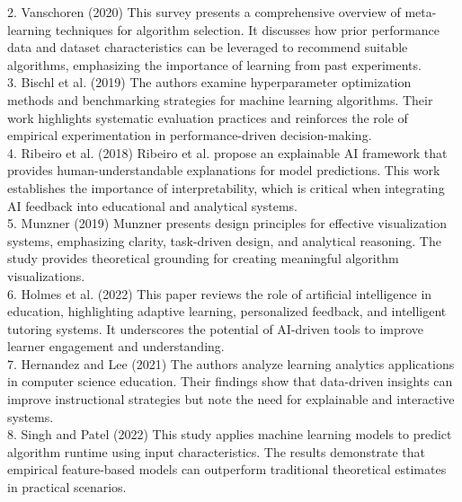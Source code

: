 \documentclass[12pt,a4paper,oneside,openany]{report}
\begin{document}
2. Vanschoren (2020) \cite{Vanschoren2020}
This survey presents a comprehensive overview of meta-learning techniques for algorithm selection. It discusses how prior performance data and dataset characteristics can be leveraged to recommend suitable algorithms, emphasizing the importance of learning from past experiments.\\

3. Bischl et al. (2019) \cite{Bischl2019}
The authors examine hyperparameter optimization methods and benchmarking strategies for machine learning algorithms. Their work highlights systematic evaluation practices and reinforces the role of empirical experimentation in performance-driven decision-making.\\

4. Ribeiro et al. (2018) \cite{Ribeiro2018}
Ribeiro et al. propose an explainable AI framework that provides human-understandable explanations for model predictions. This work establishes the importance of interpretability, which is critical when integrating AI feedback into educational and analytical systems.\\

5. Munzner (2019) \cite{Munzner2019}
Munzner presents design principles for effective visualization systems, emphasizing clarity, task-driven design, and analytical reasoning. The study provides theoretical grounding for creating meaningful algorithm visualizations.\\

6. Holmes et al. (2022) \cite{Holmes2022}
This paper reviews the role of artificial intelligence in education, highlighting adaptive learning, personalized feedback, and intelligent tutoring systems. It underscores the potential of AI-driven tools to improve learner engagement and understanding.\\

7. Hernandez and Lee (2021) \cite{Hernandez2021}
The authors analyze learning analytics applications in computer science education. Their findings show that data-driven insights can improve instructional strategies but note the need for explainable and interactive systems.\\

8. Singh and Patel (2022) \cite{Singh2022}
This study applies machine learning models to predict algorithm runtime using input characteristics. The results demonstrate that empirical feature-based models can outperform traditional theoretical estimates in practical scenarios.\\
\end{document}
